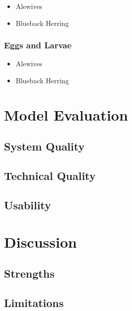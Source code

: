 \documentclass[
]{book}
\providecommand{\tightlist}{%
  \setlength{\itemsep}{0pt}\setlength{\parskip}{0pt}}
\begin{document}
\begin{itemize}
\tightlist
\item
  Alewives
\item
  Blueback Herring
\end{itemize}

\hypertarget{eggs-and-larvae-1}{%
\subsection{Eggs and Larvae}\label{eggs-and-larvae-1}}

\begin{itemize}
\tightlist
\item
  Alewives
\item
  Blueback Herring
\end{itemize}

\hypertarget{model-evaluation}{%
\chapter{Model Evaluation}\label{model-evaluation}}

\hypertarget{system-quality}{%
\section{System Quality}\label{system-quality}}

\hypertarget{technical-quality}{%
\section{Technical Quality}\label{technical-quality}}

\hypertarget{usability}{%
\section{Usability}\label{usability}}

\hypertarget{discussion}{%
\chapter{Discussion}\label{discussion}}

\hypertarget{strengths}{%
\section{Strengths}\label{strengths}}

\hypertarget{limitations}{%
\section{Limitations}\label{limitations}}
\end{document}
